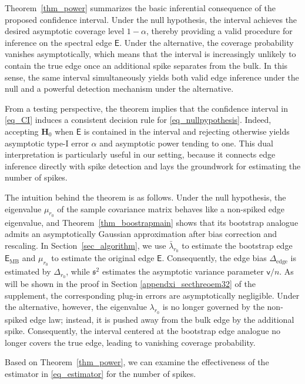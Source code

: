 \documentclass[12pt]{article}
\theoremstyle{plain}
\numberwithin{equation}{section}
\begin{document}
Theorem~\ref{thm_power} summarizes the basic inferential consequence of the proposed confidence interval. Under the null hypothesis, the interval achieves the desired asymptotic coverage level $1-\alpha$, thereby providing a valid procedure for inference on the spectral edge $\mathsf E$. Under the alternative, the coverage probability vanishes asymptotically, which means that the interval is increasingly unlikely to contain the true edge once an additional spike separates from the bulk. In this sense, the same interval simultaneously yields both valid edge inference under the null and a powerful detection mechanism under the alternative.

From a testing perspective, the theorem implies that the confidence interval in \eqref{eq_CI} induces a consistent decision rule for \eqref{eq_nullpypothesis}. Indeed, accepting $\mathbf H_0$ when $\mathsf E$ is contained in the interval and rejecting otherwise yields asymptotic type-I error $\alpha$ and asymptotic power tending to one. This dual interpretation is particularly useful in our setting, because it connects edge inference directly with spike detection and lays the groundwork for estimating the number of spikes.

The intuition behind the theorem is as follows. Under the null hypothesis, the eigenvalue $\mu_{r_0}$ of the sample covariance matrix behaves like a non-spiked edge eigenvalue, and Theorem~\ref{thm_boostrapmain} shows that its bootstrap analogue admits an asymptotically Gaussian approximation after bias correction and rescaling. In Section~\ref{sec_algorithm}, we use $\bar{\lambda}_{r_0}$ to estimate the bootstrap edge $\mathsf E_{\mathrm{MB}}$ and $\mu_{r_0}$ to estimate the original edge $\mathsf E$. Consequently, the edge bias $\Delta_{\mathrm{edge}}$ is estimated by $\Delta_{r_0}$, while $\mathfrak{s}^2$ estimates the asymptotic variance parameter $\mathsf v/n$. As will be shown in the proof in Section \ref{appendxi_secthreoem32} of the supplement, the corresponding plug-in errors are asymptotically negligible. Under the alternative, however, the eigenvalue $\lambda_{r_0}$ is no longer governed by the non-spiked edge law; instead, it is pushed away from the bulk edge by the additional spike. Consequently, the interval centered at the bootstrap edge analogue no longer covers the true edge, leading to vanishing coverage probability.

Based on Theorem~\ref{thm_power}, we can examine the effectiveness of the estimator in \eqref{eq_estimator} for the number of spikes. 
\end{document}
